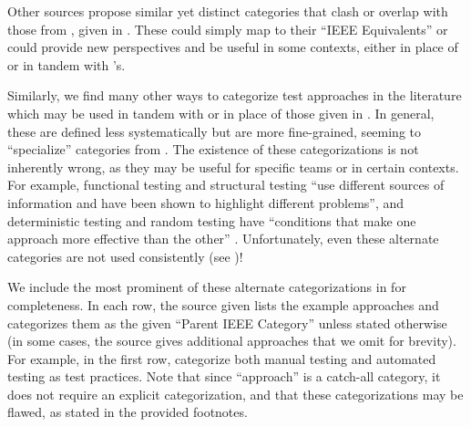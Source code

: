     Other sources \citep[such as][]{SWEBOK2024,BarbosaEtAl2006}
    propose similar yet distinct categories that clash or overlap with those
    from \citep{IEEE2022}, given in . These could simply map
    to their ``IEEE Equivalents'' or could provide new perspectives and be
    useful in some contexts, either in place of or in tandem with
    \citet{IEEE2022}'s.

    Similarly, we find many other ways to categorize test approaches in the
    literature which may be used in tandem with or in place of those given
    in . In general, these are defined less
    systematically but are more fine-grained, seeming to ``specialize''
    categories from . The existence of these categorizations
    is not inherently wrong, as they may be useful for specific teams or in
    certain contexts. For example, functional testing and structural testing
    ``use different sources of information and have been shown to highlight
    different problems'', and deterministic testing and random testing have
    ``conditions that make one approach more effective than the other''
    \citep[p.~5\=/16]{SWEBOK2024}. Unfortunately, even these alternate
    categories are not used consistently (see )!

    We include the most prominent of these alternate categorizations in
     for completeness. In each row, the source
    given lists the example approaches and categorizes them as the given
    ``Parent IEEE Category'' unless stated otherwise (in some cases, the source
    gives additional approaches that we omit for brevity). For example, in the
    first row, \citet[pp.~22, 35]{IEEE2022}
    categorize both manual testing and automated testing as test practices.
    Note that since ``approach'' is a catch-all category, it does not require
    an explicit categorization, and that these categorizations may be
    flawed, as stated in the provided footnotes.

    \afterpage{
        \begin{landscape}
            \otherCategorizationsTable{}
        \end{landscape}
    }

